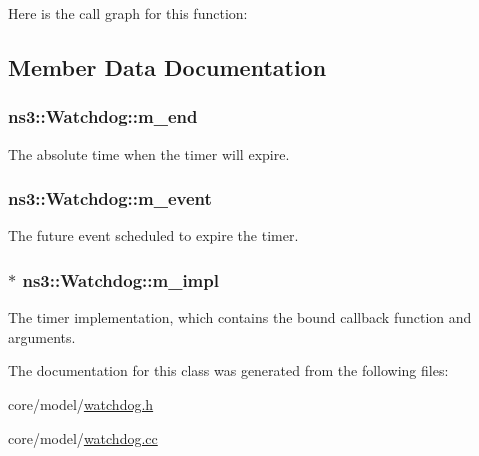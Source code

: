 Here is the call graph for this function\+:




\subsection{Member Data Documentation}
\subsubsection[{\texorpdfstring{m\+\_\+end}{m_end}}]{ ns3\+::\+Watchdog\+::m\+\_\+end\hspace{0.3cm}{\ttfamily [private]}}\hypertarget{classns3_1_1Watchdog_aec3be76124b68f4ff3ec9331d7f23a3f}{}\label{classns3_1_1Watchdog_aec3be76124b68f4ff3ec9331d7f23a3f}
The absolute time when the timer will expire. 
\subsubsection[{\texorpdfstring{m\+\_\+event}{m_event}}]{ ns3\+::\+Watchdog\+::m\+\_\+event\hspace{0.3cm}{\ttfamily [private]}}\hypertarget{classns3_1_1Watchdog_a7d8678d211f73cfc2541649ce534d2db}{}\label{classns3_1_1Watchdog_a7d8678d211f73cfc2541649ce534d2db}
The future event scheduled to expire the timer. 
\subsubsection[{\texorpdfstring{m\+\_\+impl}{m_impl}}]{$\ast$ ns3\+::\+Watchdog\+::m\+\_\+impl\hspace{0.3cm}{\ttfamily [private]}}\hypertarget{classns3_1_1Watchdog_ac8ff50cdff62e1549d5a5e8973003a9a}{}\label{classns3_1_1Watchdog_ac8ff50cdff62e1549d5a5e8973003a9a}
The timer implementation, which contains the bound callback function and arguments. 

The documentation for this class was generated from the following files\+:\begin{DoxyCompactItemize}
\item 
core/model/\hyperlink{watchdog_8h}{watchdog.\+h}\item 
core/model/\hyperlink{watchdog_8cc}{watchdog.\+cc}\end{DoxyCompactItemize}
